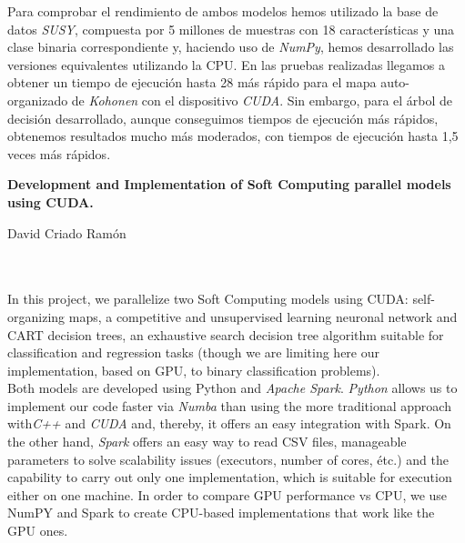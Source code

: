 Para comprobar el rendimiento de ambos modelos hemos utilizado la base de datos \textit{SUSY}, compuesta por 5 millones de muestras con 18 características y una clase binaria correspondiente y, haciendo uso de \textit{NumPy}, hemos desarrollado las versiones equivalentes utilizando la CPU. En las pruebas realizadas llegamos a obtener un tiempo de ejecución hasta 28 más rápido para el mapa auto-organizado de \textit{Kohonen} con el dispositivo \textit{CUDA}. Sin embargo, para el árbol de decisión desarrollado, aunque conseguimos tiempos de ejecución más rápidos, obtenemos resultados mucho más moderados, con tiempos de ejecución hasta 1,5 veces más rápidos.


\thispagestyle{empty}


\begin{center}
{\large\bfseries Development and Implementation of Soft Computing parallel models using CUDA.}\\
\end{center}
\begin{center}
David Criado Ramón\\
\end{center}

\\

\vspace{0.7cm}
\\

In this project, we parallelize two Soft Computing models using CUDA: self-organizing maps, a competitive and unsupervised learning neuronal network and CART decision trees, an exhaustive search decision tree algorithm suitable for classification and regression tasks (though we are limiting here our implementation, based on GPU, to binary classification problems).\\

Both models are developed using Python and \textit{Apache Spark}. \textit{Python} allows us to implement our code faster via \textit{Numba} than using the more traditional approach with\textit{C++} and \textit{CUDA} and, thereby, it offers an easy integration with Spark. On the other hand, \textit{Spark} offers an easy way to read CSV files, manageable parameters to solve scalability issues (executors, number of cores, étc.) and the capability to carry out only one implementation, which is  suitable for execution either on one machine. In order to compare GPU performance vs CPU, we use NumPY and Spark to create CPU-based implementations that work like the GPU ones.\\

